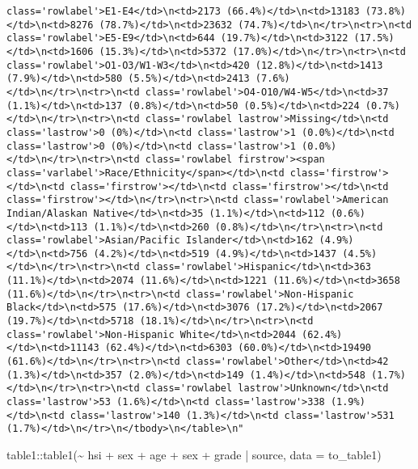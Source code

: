 \documentclass[
]{article}
\newenvironment{Shaded}{\begin{snugshade}}{\end{snugshade}}
\newcommand{\AttributeTok}[1]{\textcolor[rgb]{0.77,0.63,0.00}{#1}}
\newcommand{\FunctionTok}[1]{\textcolor[rgb]{0.00,0.00,0.00}{#1}}
\newcommand{\NormalTok}[1]{#1}
\newcommand{\SpecialCharTok}[1]{\textcolor[rgb]{0.00,0.00,0.00}{#1}}
\begin{document}
\begin{verbatim}
class='rowlabel'>E1-E4</td>\n<td>2173 (66.4%)</td>\n<td>13183 (73.8%)</td>\n<td>8276 (78.7%)</td>\n<td>23632 (74.7%)</td>\n</tr>\n<tr>\n<td class='rowlabel'>E5-E9</td>\n<td>644 (19.7%)</td>\n<td>3122 (17.5%)</td>\n<td>1606 (15.3%)</td>\n<td>5372 (17.0%)</td>\n</tr>\n<tr>\n<td class='rowlabel'>O1-O3/W1-W3</td>\n<td>420 (12.8%)</td>\n<td>1413 (7.9%)</td>\n<td>580 (5.5%)</td>\n<td>2413 (7.6%)</td>\n</tr>\n<tr>\n<td class='rowlabel'>O4-O10/W4-W5</td>\n<td>37 (1.1%)</td>\n<td>137 (0.8%)</td>\n<td>50 (0.5%)</td>\n<td>224 (0.7%)</td>\n</tr>\n<tr>\n<td class='rowlabel lastrow'>Missing</td>\n<td class='lastrow'>0 (0%)</td>\n<td class='lastrow'>1 (0.0%)</td>\n<td class='lastrow'>0 (0%)</td>\n<td class='lastrow'>1 (0.0%)</td>\n</tr>\n<tr>\n<td class='rowlabel firstrow'><span class='varlabel'>Race/Ethnicity</span></td>\n<td class='firstrow'></td>\n<td class='firstrow'></td>\n<td class='firstrow'></td>\n<td class='firstrow'></td>\n</tr>\n<tr>\n<td class='rowlabel'>American Indian/Alaskan Native</td>\n<td>35 (1.1%)</td>\n<td>112 (0.6%)</td>\n<td>113 (1.1%)</td>\n<td>260 (0.8%)</td>\n</tr>\n<tr>\n<td class='rowlabel'>Asian/Pacific Islander</td>\n<td>162 (4.9%)</td>\n<td>756 (4.2%)</td>\n<td>519 (4.9%)</td>\n<td>1437 (4.5%)</td>\n</tr>\n<tr>\n<td class='rowlabel'>Hispanic</td>\n<td>363 (11.1%)</td>\n<td>2074 (11.6%)</td>\n<td>1221 (11.6%)</td>\n<td>3658 (11.6%)</td>\n</tr>\n<tr>\n<td class='rowlabel'>Non-Hispanic Black</td>\n<td>575 (17.6%)</td>\n<td>3076 (17.2%)</td>\n<td>2067 (19.7%)</td>\n<td>5718 (18.1%)</td>\n</tr>\n<tr>\n<td class='rowlabel'>Non-Hispanic White</td>\n<td>2044 (62.4%)</td>\n<td>11143 (62.4%)</td>\n<td>6303 (60.0%)</td>\n<td>19490 (61.6%)</td>\n</tr>\n<tr>\n<td class='rowlabel'>Other</td>\n<td>42 (1.3%)</td>\n<td>357 (2.0%)</td>\n<td>149 (1.4%)</td>\n<td>548 (1.7%)</td>\n</tr>\n<tr>\n<td class='rowlabel lastrow'>Unknown</td>\n<td class='lastrow'>53 (1.6%)</td>\n<td class='lastrow'>338 (1.9%)</td>\n<td class='lastrow'>140 (1.3%)</td>\n<td class='lastrow'>531 (1.7%)</td>\n</tr>\n</tbody>\n</table>\n"
\end{verbatim}

\begin{Shaded}
\begin{Highlighting}[]
\NormalTok{table1}\SpecialCharTok{::}\FunctionTok{table1}\NormalTok{(}\SpecialCharTok{\textasciitilde{}}\NormalTok{ hsi }\SpecialCharTok{+}\NormalTok{ sex }\SpecialCharTok{+}\NormalTok{ age }\SpecialCharTok{+}\NormalTok{ sex }\SpecialCharTok{+}\NormalTok{ grade   }\SpecialCharTok{|}\NormalTok{ source, }\AttributeTok{data =}\NormalTok{ to\_table1)  }
\end{Highlighting}
\end{Shaded}
\end{document}
